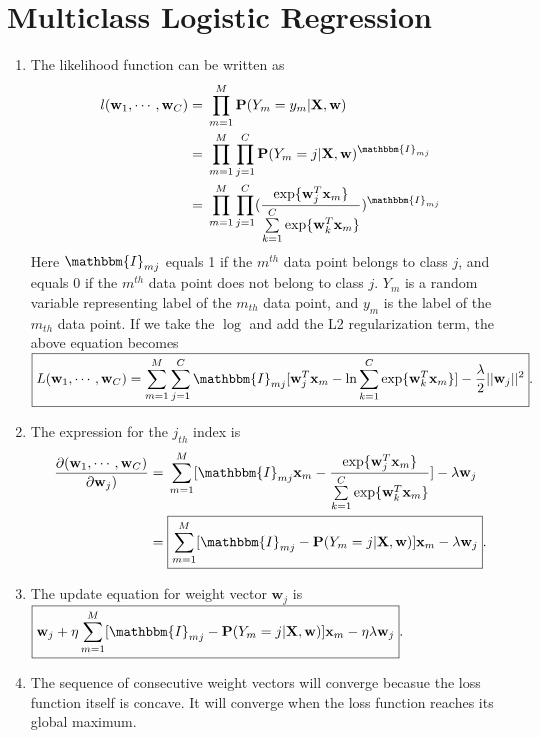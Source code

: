 \documentclass[english]{article}
\begin{document}
\section{Multiclass Logistic Regression}
\begin{enumerate}
    \item The likelihood function can be written as\\
    \begin{align*}
     l(\mathbf{w}_1,\cdots,\mathbf{w}_C)=&\;\prod\limits_{m=1}^M\mathbf{P}(Y_m=y_m|\mathbf{X},\mathbf{w})\\
     =&\; \prod\limits_{m=1}^M \prod\limits_{j=1}^C \mathbf{P}(Y_m=j|\mathbf{X},\mathbf{w})^{\mathbbm{I}_{mj}}\\
     =&\; \prod\limits_{m=1}^M \prod\limits_{j=1}^C (\dfrac{\exp\{{\mathbf{w}_j^T}\mathbf{x}_m\}}{\sum\limits_{k=1}^C\exp\{{\mathbf{w}_k^T}\mathbf{x}_m\}})^{\mathbbm{I}_{mj}}\\
     \end{align*}
     Here $\mathbbm{I}_{mj}$ equals 1 if the $m^{th}$ data point belongs to class $j$, and equals 0 if the $m^{th}$ data point does not belong to class $j$. $Y_m$ is a random variable representing label of the $m_{th}$ data point, and $y_m$ is the label of the $m_{th}$ data point. If we take the $\log$ and add the L2 regularization term, the above equation becomes $\boxed{L(\mathbf{w}_1,\cdots,\mathbf{w}_C)=\sum\limits_{m=1}^M \sum\limits_{j=1}^C \mathbbm{I}_{mj}[\mathbf{w}_j^T\mathbf{x}_m-\ln\sum\limits_{k=1}^C\exp\{{\mathbf{w}_k^T\mathbf{x}_m\}}]-\dfrac{\lambda}{2}||\mathbf{w}_j||^2}.$

     \item The expression for the $j_{th}$ index is\\
     \begin{align*}
     \dfrac{\partial(\mathbf{w}_1,\cdots,\mathbf{w}_C)}{\partial\mathbf{w}_j)} = &\; \sum\limits_{m=1}^M[\mathbbm{I}_{mj}\mathbf{x}_m - \dfrac{\exp\{{\mathbf{w}_j^T}\mathbf{x}_m\}}{\sum\limits_{k=1}^C\exp\{{\mathbf{w}_k^T}\mathbf{x}_m\}}]-\lambda\mathbf{w}_j\\
     =&\;\boxed{\sum\limits_{m=1}^M[\mathbbm{I}_{mj}-\mathbf{P}(Y_m=j|\mathbf{X},\mathbf{w})]\mathbf{x}_m-\lambda\mathbf{w}_j}.\\
     \end{align*}

     \item The update equation for weight vector $\mathbf{w}_j$ is $\boxed{\mathbf{w}_j+\eta\sum\limits_{m=1}^M[\mathbbm{I}_{mj}-\mathbf{P}(Y_m=j|\mathbf{X},\mathbf{w})]\mathbf{x}_m-\eta\lambda\mathbf{w}_j}.$

     \item The sequence of consecutive weight vectors will converge becasue the loss function itself is concave. It will converge when the loss function reaches its global maximum.\\
\end{enumerate}
\clearpage
\end{document}
